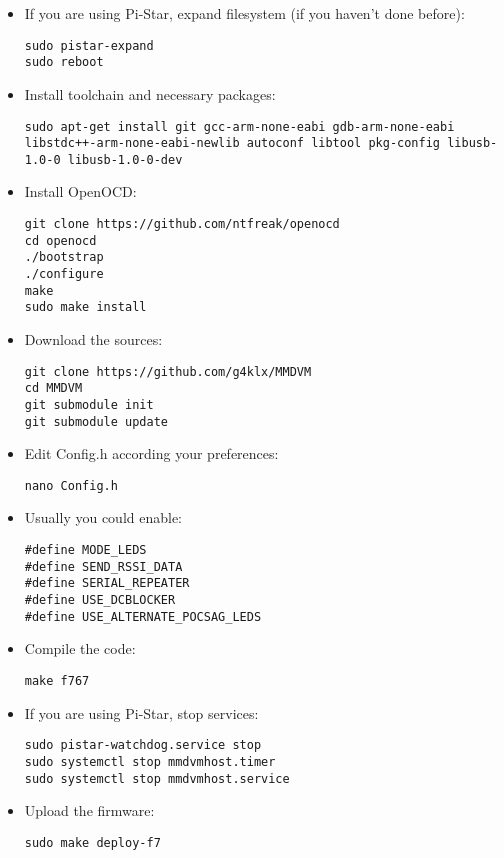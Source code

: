 \documentclass[]{article}
\begin{document}
\begin{itemize}[leftmargin=*]

\item If you are using Pi-Star, expand filesystem (if you haven't done before):
\begin{lstlisting}[style=DOS]
sudo pistar-expand
sudo reboot
\end{lstlisting}

\item Install toolchain and necessary packages:
\begin{lstlisting}[style=DOS]
sudo apt-get install git gcc-arm-none-eabi gdb-arm-none-eabi libstdc++-arm-none-eabi-newlib autoconf libtool pkg-config libusb-1.0-0 libusb-1.0-0-dev
\end{lstlisting}

\item Install OpenOCD:
\begin{lstlisting}[style=DOS]
git clone https://github.com/ntfreak/openocd
cd openocd
./bootstrap
./configure
make
sudo make install
\end{lstlisting}

\item Download the sources:
\begin{lstlisting}[style=DOS]
git clone https://github.com/g4klx/MMDVM
cd MMDVM
git submodule init
git submodule update
\end{lstlisting}

\item Edit Config.h according your preferences:
\begin{lstlisting}[style=DOS]
nano Config.h
\end{lstlisting}

\item Usually you could enable:

\begin{verbatim}
#define MODE_LEDS
#define SEND_RSSI_DATA
#define SERIAL_REPEATER
#define USE_DCBLOCKER
#define USE_ALTERNATE_POCSAG_LEDS
\end{verbatim}

\item Compile the code:
\begin{lstlisting}[style=DOS]
make f767
\end{lstlisting}

\item If you are using Pi-Star, stop services:
\begin{lstlisting}[style=DOS]
sudo pistar-watchdog.service stop
sudo systemctl stop mmdvmhost.timer
sudo systemctl stop mmdvmhost.service
\end{lstlisting}

\item Upload the firmware:
\begin{lstlisting}[style=DOS]
sudo make deploy-f7
\end{lstlisting}

\end{itemize}
\end{document}
